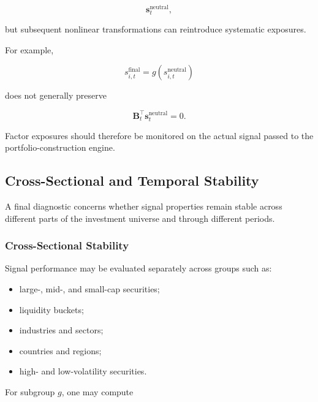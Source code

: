 \documentclass[11pt,a4paper]{article}
\begin{document}
\begin{equation}
\mathbf{s}_t^{\mathrm{neutral}},
\end{equation}

but subsequent nonlinear transformations can reintroduce systematic exposures.

For example,

\begin{equation}
s_{i,t}^{\mathrm{final}}
=
g
\left(
s_{i,t}^{\mathrm{neutral}}
\right)
\end{equation}

does not generally preserve

\begin{equation}
\mathbf{B}_t^\top
\mathbf{s}_t^{\mathrm{neutral}}
=
0.
\end{equation}

Factor exposures should therefore be monitored on the actual signal passed to
the portfolio-construction engine.


\subsection{Cross-Sectional and Temporal Stability}
\label{subsec:cross_sectional_temporal_stability}

A final diagnostic concerns whether signal properties remain stable across
different parts of the investment universe and through different periods.


\subsubsection{Cross-Sectional Stability}

Signal performance may be evaluated separately across groups such as:

\begin{itemize}
    \item large-, mid-, and small-cap securities;
    \item liquidity buckets;
    \item industries and sectors;
    \item countries and regions;
    \item high- and low-volatility securities.
\end{itemize}

For subgroup $g$, one may compute
\end{document}
